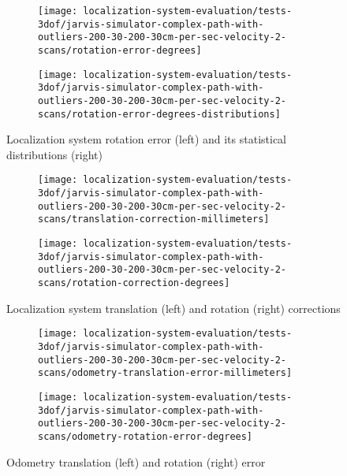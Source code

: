 \begin{figure}[H]
	\centering
	\begin{subfigure}[h]{0.47\textwidth}
		\centering
		\texttt{[image: localization-system-evaluation/tests-3dof/jarvis-simulator-complex-path-with-outliers-200-30-200-30cm-per-sec-velocity-2-scans/rotation-error-degrees]}
	\end{subfigure}
	\begin{subfigure}[h]{0.47\textwidth}
		\centering
		\texttt{[image: localization-system-evaluation/tests-3dof/jarvis-simulator-complex-path-with-outliers-200-30-200-30cm-per-sec-velocity-2-scans/rotation-error-degrees-distributions]}
	\end{subfigure}
	\caption{Localization system rotation error (left) and its statistical distributions (right)}
	\label{fig:localization-system-evaluation_jarvis-simulator-complex-path-with-outliers-200-30-200-30cm-per-sec-velocity-2-scans_rotation-errors}
\end{figure}

\begin{figure}[ht]
	\centering
	\begin{subfigure}[h]{0.47\textwidth}
		\centering
		\texttt{[image: localization-system-evaluation/tests-3dof/jarvis-simulator-complex-path-with-outliers-200-30-200-30cm-per-sec-velocity-2-scans/translation-correction-millimeters]}
	\end{subfigure}
	\begin{subfigure}[h]{0.47\textwidth}
		\centering
		\texttt{[image: localization-system-evaluation/tests-3dof/jarvis-simulator-complex-path-with-outliers-200-30-200-30cm-per-sec-velocity-2-scans/rotation-correction-degrees]}
	\end{subfigure}
	\caption{Localization system translation (left) and rotation (right) corrections}
	\label{fig:localization-system-evaluation_jarvis-simulator-complex-path-with-outliers-200-30-200-30cm-per-sec-velocity-2-scans_translation-rotation-corrections}
\end{figure}

\begin{figure}[ht]
	\centering
	\begin{subfigure}[h]{0.47\textwidth}
		\centering
		\texttt{[image: localization-system-evaluation/tests-3dof/jarvis-simulator-complex-path-with-outliers-200-30-200-30cm-per-sec-velocity-2-scans/odometry-translation-error-millimeters]}
	\end{subfigure}
	\begin{subfigure}[h]{0.47\textwidth}
		\centering
		\texttt{[image: localization-system-evaluation/tests-3dof/jarvis-simulator-complex-path-with-outliers-200-30-200-30cm-per-sec-velocity-2-scans/odometry-rotation-error-degrees]}
	\end{subfigure}
	\caption{Odometry translation (left) and rotation (right) error}
	\label{fig:localization-system-evaluation_jarvis-simulator-complex-path-with-outliers-200-30-200-30cm-per-sec-velocity-2-scans_odometry-translation-rotation-errors}
\end{figure}

